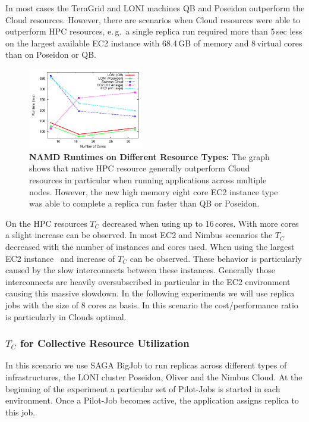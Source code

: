 \documentclass[conference,final]{IEEEtran}
\newcommand{\tc}{$T_{C}$ }
\begin{document}
In most cases the TeraGrid and LONI machines QB and Poseidon
outperform the Cloud resources.  However, there are scenarios when
Cloud resources were able to outperform HPC resources, e.\,g.\ a
single replica run required more than 5\,sec less on the largest
available EC2 instance with 68.4\,GB of memory and 8\,virtual cores
than on Poseidon or QB.

\begin{figure}[htbp]
    \centering
    \includegraphics[width=0.45\textwidth]{performance/namd_run.pdf}
    \caption{\textbf{NAMD Runtimes on Different Resource Types: } The
      graph shows that native HPC resource generally outperform Cloud
      resources in particular when running applications across
      multiple nodes. However, the new high memory eight core EC2
      instance type was able to complete a replica run faster than QB
      or Poseidon.}
    \label{fig:performance_namd_run}
\end{figure}

On the HPC resources \tc decreased when using up to 16\,cores. With
more cores a slight increase can be observed. In most EC2 and Nimbus
scenarios the \tc decreased with the number of instances and cores
used. When using the largest EC2 instance~\cite{new-ec2} and increase
of \tc can be observed. These behavior is particularly caused by the
slow interconnects between these instances. Generally those
interconnects are heavily oversubscribed in particular in the EC2
environment causing this massive slowdown. In the following
experiments we will use replica jobs with the size of 8 cores as
basis. In this scenario the cost/performance ratio is particularly in
Clouds optimal.

\subsubsection{\tc for Collective Resource Utilization}

In this scenario we use SAGA BigJob to run replicas across
different types of infrastructures, the LONI
cluster Poseidon, Oliver and the Nimbus Cloud. 
At the beginning of the experiment a particular set of
Pilot-Jobs is started in each environment. Once a Pilot-Job becomes
active, the application assigns replica to this job. 
\end{document}
